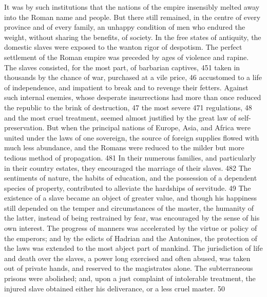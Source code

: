 It was by such institutions that the nations of the empire
insensibly melted away into the Roman name and people. But there
still remained, in the centre of every province and of every
family, an unhappy condition of men who endured the weight,
without sharing the benefits, of society. In the free states of
antiquity, the domestic slaves were exposed to the wanton rigor
of despotism. The perfect settlement of the Roman empire was
preceded by ages of violence and rapine. The slaves consisted,
for the most part, of barbarian captives, 451 taken in thousands
by the chance of war, purchased at a vile price, 46 accustomed to
a life of independence, and impatient to break and to revenge
their fetters. Against such internal enemies, whose desperate
insurrections had more than once reduced the republic to the
brink of destruction, 47 the most severe 471 regulations, 48 and
the most cruel treatment, seemed almost justified by the great
law of self-preservation. But when the principal nations of
Europe, Asia, and Africa were united under the laws of one
sovereign, the source of foreign supplies flowed with much less
abundance, and the Romans were reduced to the milder but more
tedious method of propagation. 481 In their numerous families,
and particularly in their country estates, they encouraged the
marriage of their slaves. 482 The sentiments of nature, the
habits of education, and the possession of a dependent species of
property, contributed to alleviate the hardships of servitude. 49
The existence of a slave became an object of greater value, and
though his happiness still depended on the temper and
circumstances of the master, the humanity of the latter, instead
of being restrained by fear, was encouraged by the sense of his
own interest. The progress of manners was accelerated by the
virtue or policy of the emperors; and by the edicts of Hadrian
and the Antonines, the protection of the laws was extended to the
most abject part of mankind. The jurisdiction of life and death
over the slaves, a power long exercised and often abused, was
taken out of private hands, and reserved to the magistrates
alone. The subterraneous prisons were abolished; and, upon a just
complaint of intolerable treatment, the injured slave obtained
either his deliverance, or a less cruel master. 50

